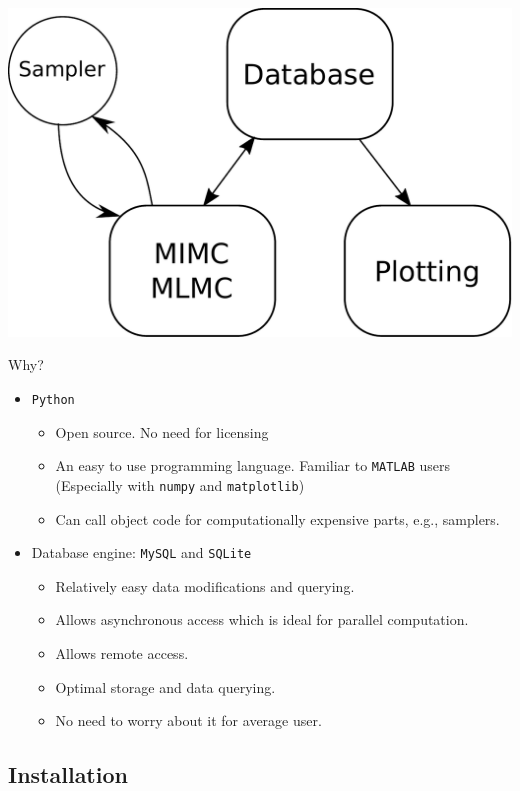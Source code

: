 \begin{frame}
\centering
\includegraphics[scale=0.4]{src/imgs/scheme}
\end{frame}

\begin{frame}{Why?}
  \begin{itemize}
  \item \texttt{Python}
    \begin{itemize}
    \item Open source. No need for licensing
    \item An easy to use programming language. Familiar to
      \texttt{MATLAB} users (Especially with \texttt{numpy} and \texttt{matplotlib})
    \item Can call object code for computationally expensive parts,
      e.g., samplers.
    \end{itemize}
    \item Database engine: \texttt{MySQL} and \texttt{SQLite}
      \begin{itemize}
      \item Relatively easy data modifications and querying.
      \item Allows asynchronous access which is ideal for parallel computation.
      \item Allows remote access.
      \item Optimal storage and data querying.
      \item No need to worry about it for average user.
      \end{itemize}
    \end{itemize}
\end{frame}

\subsection{Installation}

